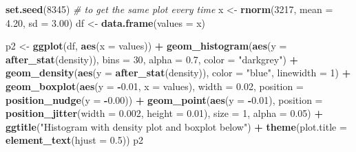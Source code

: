 \documentclass[
]{book}
\newenvironment{Shaded}{\begin{snugshade}}{\end{snugshade}}
\newcommand{\AttributeTok}[1]{\textcolor[rgb]{0.13,0.29,0.53}{#1}}
\newcommand{\CommentTok}[1]{\textcolor[rgb]{0.56,0.35,0.01}{\textit{#1}}}
\newcommand{\DecValTok}[1]{\textcolor[rgb]{0.00,0.00,0.81}{#1}}
\newcommand{\FloatTok}[1]{\textcolor[rgb]{0.00,0.00,0.81}{#1}}
\newcommand{\FunctionTok}[1]{\textcolor[rgb]{0.13,0.29,0.53}{\textbf{#1}}}
\newcommand{\NormalTok}[1]{#1}
\newcommand{\OtherTok}[1]{\textcolor[rgb]{0.56,0.35,0.01}{#1}}
\newcommand{\SpecialCharTok}[1]{\textcolor[rgb]{0.81,0.36,0.00}{\textbf{#1}}}
\newcommand{\StringTok}[1]{\textcolor[rgb]{0.31,0.60,0.02}{#1}}
\begin{document}
\begin{Shaded}
\begin{Highlighting}[]
\FunctionTok{set.seed}\NormalTok{(}\DecValTok{8345}\NormalTok{) }\CommentTok{\# to get the same plot every time}
\NormalTok{x }\OtherTok{\textless{}{-}} \FunctionTok{rnorm}\NormalTok{(}\DecValTok{3217}\NormalTok{, }\AttributeTok{mean =} \FloatTok{4.20}\NormalTok{, }\AttributeTok{sd =} \FloatTok{3.00}\NormalTok{)}
\NormalTok{df }\OtherTok{\textless{}{-}} \FunctionTok{data.frame}\NormalTok{(}\AttributeTok{values =}\NormalTok{ x)}

\NormalTok{p2 }\OtherTok{\textless{}{-}} \FunctionTok{ggplot}\NormalTok{(df, }\FunctionTok{aes}\NormalTok{(}\AttributeTok{x =}\NormalTok{ values)) }\SpecialCharTok{+}
  \FunctionTok{geom\_histogram}\NormalTok{(}\FunctionTok{aes}\NormalTok{(}\AttributeTok{y =} \FunctionTok{after\_stat}\NormalTok{(density)),}
                 \AttributeTok{bins =} \DecValTok{30}\NormalTok{, }\AttributeTok{alpha =} \FloatTok{0.7}\NormalTok{, }\AttributeTok{color =} \StringTok{"darkgrey"}\NormalTok{) }\SpecialCharTok{+}
  \FunctionTok{geom\_density}\NormalTok{(}\FunctionTok{aes}\NormalTok{(}\AttributeTok{y =} \FunctionTok{after\_stat}\NormalTok{(density)), }\AttributeTok{color =} \StringTok{"blue"}\NormalTok{, }\AttributeTok{linewidth =} \DecValTok{1}\NormalTok{) }\SpecialCharTok{+}
  \FunctionTok{geom\_boxplot}\NormalTok{(}\FunctionTok{aes}\NormalTok{(}\AttributeTok{y =} \SpecialCharTok{{-}}\FloatTok{0.01}\NormalTok{, }\AttributeTok{x =}\NormalTok{ values), }\AttributeTok{width =} \FloatTok{0.02}\NormalTok{,}
               \AttributeTok{position =} \FunctionTok{position\_nudge}\NormalTok{(}\AttributeTok{y =} \SpecialCharTok{{-}}\FloatTok{0.00}\NormalTok{)) }\SpecialCharTok{+}
  \FunctionTok{geom\_point}\NormalTok{(}\FunctionTok{aes}\NormalTok{(}\AttributeTok{y =} \SpecialCharTok{{-}}\FloatTok{0.01}\NormalTok{),}
             \AttributeTok{position =} \FunctionTok{position\_jitter}\NormalTok{(}\AttributeTok{width =} \FloatTok{0.002}\NormalTok{, }\AttributeTok{height =} \FloatTok{0.01}\NormalTok{),}
             \AttributeTok{size =} \DecValTok{1}\NormalTok{, }\AttributeTok{alpha =} \FloatTok{0.05}\NormalTok{) }\SpecialCharTok{+}
  \FunctionTok{ggtitle}\NormalTok{(}\StringTok{"Histogram with density plot and boxplot below"}\NormalTok{) }\SpecialCharTok{+}
  \FunctionTok{theme}\NormalTok{(}\AttributeTok{plot.title =} \FunctionTok{element\_text}\NormalTok{(}\AttributeTok{hjust =} \FloatTok{0.5}\NormalTok{))}
\NormalTok{p2}
\end{Highlighting}
\end{Shaded}
\end{document}
